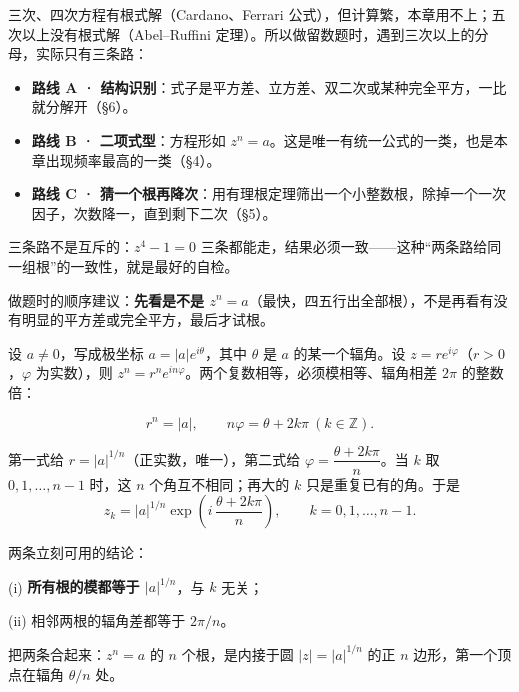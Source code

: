 \documentclass[11pt]{ctexart}
\let\origsubhdr\subhdr
\renewcommand{\subhdr}[1]{\par\needspace{4\baselineskip}\origsubhdr{#1}}
\let\orighdr\hdr
\renewcommand{\hdr}[2]{\par\orighdr{#1}{#2}}
\begin{document}
三次、四次方程有根式解（Cardano、Ferrari 公式），但计算繁，本章用不上；五次以上没有根式解（Abel--Ruffini 定理）。所以做留数题时，遇到三次以上的分母，实际只有三条路：

\begin{itemize}
\item \textbf{路线 A · 结构识别}：式子是平方差、立方差、双二次或某种完全平方，一比就分解开（§6）。
\item \textbf{路线 B · 二项式型}：方程形如 $z^{n}=a$。这是唯一有统一公式的一类，也是本章出现频率最高的一类（§4）。
\item \textbf{路线 C · 猜一个根再降次}：用有理根定理筛出一个小整数根，除掉一个一次因子，次数降一，直到剩下二次（§5）。
\end{itemize}

三条路不是互斥的：$z^{4}-1=0$ 三条都能走，结果必须一致——这种“两条路给同一组根”的一致性，就是最好的自检。

做题时的顺序建议：\textbf{先看是不是 $z^{n}=a$}（最快，四五行出全部根），不是再看有没有明显的平方差或完全平方，最后才试根。




设 $a\ne0$，写成极坐标 $a=|a|e^{i\theta}$，其中 $\theta$ 是 $a$ 的某一个辐角。设 $z=re^{i\varphi}$（$r>0$，$\varphi$ 为实数），则 $z^{n}=r^{n}e^{in\varphi}$。两个复数相等，必须模相等、辐角相差 $2\pi$ 的整数倍：

\[ r^{n}=|a|,\qquad n\varphi=\theta+2k\pi\ (k\in\mathbb{Z}). \]

第一式给 $r=|a|^{1/n}$（正实数，唯一），第二式给 $\varphi=\dfrac{\theta+2k\pi}{n}$。当 $k$ 取 $0,1,\dots,n-1$ 时，这 $n$ 个角互不相同；再大的 $k$ 只是重复已有的角。于是
\begin{equation}
z_k=|a|^{1/n}\exp\left(i\,\frac{\theta+2k\pi}{n}\right),
\qquad k=0,1,\dots,n-1 .
\label{eq:roots}
\end{equation}

两条立刻可用的结论：

(i) \textbf{所有根的模都等于 $|a|^{1/n}$}，与 $k$ 无关；

(ii) 相邻两根的辐角差都等于 $2\pi/n$。

把两条合起来：$z^{n}=a$ 的 $n$ 个根，是内接于圆 $|z|=|a|^{1/n}$ 的正 $n$ 边形，第一个顶点在辐角 $\theta/n$ 处。
\end{document}

